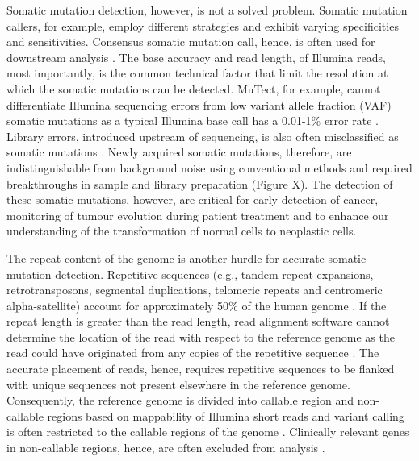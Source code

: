 Somatic mutation detection, however, is not a solved problem. Somatic mutation callers, for example, employ different strategies and exhibit varying specificities and sensitivities. Consensus somatic mutation call, hence, is often used for downstream analysis \cite{Bailey2020-ou}. The base accuracy and read length, of Illumina reads, most importantly, is the common technical factor that limit the resolution at which the somatic mutations can be detected. MuTect, for example, cannot differentiate Illumina sequencing errors from low variant allele fraction (VAF) somatic mutations as a typical Illumina base call has a 0.01-1\% error rate \cite{Cibulskis2013-gw}. Library errors, introduced upstream of sequencing, is also often misclassified as somatic mutations \cite{Costello2013-cz, Chen2017-ba, Abascal2021-pk}. Newly acquired somatic mutations, therefore, are indistinguishable from background noise using conventional methods and required breakthroughs in sample and library preparation (Figure X). The detection of these somatic mutations, however, are critical for early detection of cancer, monitoring of tumour evolution during patient treatment and to enhance our understanding of the transformation of normal cells to neoplastic cells. 

The repeat content of the genome is another hurdle for accurate somatic mutation detection. Repetitive sequences (e.g., tandem repeat expansions, retrotransposons, segmental duplications, telomeric repeats and centromeric alpha-satellite) account for approximately 50\% of the human genome \cite{Lander2001-du}. If the repeat length is greater than the read length, read alignment software cannot determine the location of the read with respect to the reference genome as the read could have originated from any copies of the repetitive sequence \cite{Li2008-dt}. The accurate placement of reads, hence, requires repetitive sequences to be flanked with unique sequences not present elsewhere in the reference genome. Consequently, the reference genome is divided into callable region and non-callable regions based on mappability of Illumina short reads and variant calling is often restricted to the callable regions of the genome \cite{1000_Genomes_Project_Consortium2012-rj}. Clinically relevant genes in non-callable regions, hence, are often excluded from analysis \cite{Wagner2022-ph}.


